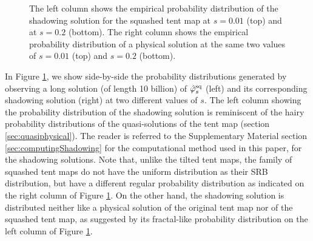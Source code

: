 \begin{figure}
    \caption{The left column shows the empirical probability distribution of the shadowing solution for the squashed tent map at $s=0.01$ (top) and at $s=0.2$ (bottom). The right column shows the empirical probability distribution of a physical solution at the same two values of $s = 0.01$ (top) and $s = 0.2$ (bottom).}
    \label{fig:tent_squashed_shadow}
\end{figure}
In Figure \ref{fig:tent_squashed_shadow}, we show side-by-side the probability distributions generated by observing a long solution (of length 10 billion) 
of $\hat{\varphi}^{\rm sq}_s$ (left) and its corresponding shadowing solution (right)
at two different values of $s.$ The left column showing the probability distribution of the shadowing solution is reminiscent of the hairy probability distributions of 
the quasi-solutions of the tent map (section \ref{sec:quasiphysical}). The reader is referred to the Supplementary Material section \ref{sec:computingShadowing} for the computational method used in this paper, for the shadowing solutions. Note that, unlike the tilted tent maps, the family of squashed tent maps do not have the uniform distribution as their SRB distribution, but have a different regular probability distribution as indicated on the right column of Figure \ref{fig:tent_squashed_shadow}. On the other hand, the shadowing solution is distributed neither like a physical solution of the original tent map nor of the squashed tent map, as suggested by its fractal-like probability distribution on the left column of Figure \ref{fig:tent_squashed_shadow}.


